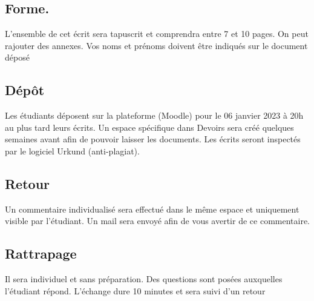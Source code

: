 \subsection{Forme.}
L’ensemble de cet écrit sera tapuscrit et comprendra entre 7 et 10 pages. On peut rajouter des annexes. Vos noms et prénoms
doivent être indiqués sur le document déposé
\subsection{Dépôt}
Les étudiants déposent sur la plateforme (Moodle) pour le 06 janvier 2023 à 20h au plus tard
leurs écrits. Un espace spécifique dans Devoirs sera créé quelques semaines avant afin de
pouvoir laisser les documents. Les écrits seront inspectés par le logiciel Urkund (anti-plagiat).
\subsection{Retour} 
Un commentaire individualisé sera effectué dans le même espace et uniquement visible par
l’étudiant. Un mail sera envoyé afin de vous avertir de ce commentaire.
\subsection{Rattrapage} 
Il sera individuel et sans préparation. Des questions sont posées auxquelles l’étudiant répond.
L’échange dure 10 minutes et sera suivi d’un retour

